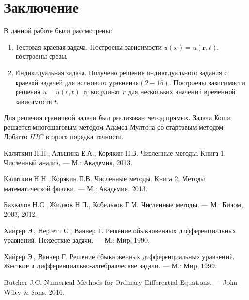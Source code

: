 \documentclass[a4paper,12pt]{article}
\begin{document}
\newpage
\section*{Заключение}
В данной работе были рассмотрены:
 \begin{enumerate}
 	\item Тестовая краевая задача. Построены зависимости $u(x) = u(\textbf{r} , t)$, построены срезы.
 	\item Индивидуальная задача. Получено решение индивидуального задания с краевой задачей для волнового уравнения$(2 - 15)$.
 	Построены зависимости решения \qquad $u = u(r, t)$ от координат $r$ для нескольких значений временной зависимости $t$.
 \end{enumerate}
Для решения граничной задачи был реализован метод прямых. Задача Коши решается многошаговым методом Адамса-Мултона со стартовым методом Лобатто $IIIC$ второго порядка точности.\\


\newpage
{}
\begin{thebibliography}{99}

Калиткин Н.Н., Альшина Е.А., Корякин П.В. 
Численные методы. Книга 1. Численный анализ. --- М.: Академия, 2013. 

Калиткин Н.Н., Корякин П.В. 
Численные методы. Книга 2. Методы математической физики. --- М.: Академия, 2013. 

Бахвалов Н.С., Жидков Н.П., Кобельков Г.М. 
Численные методы. --- М.: Бином, 2003, 2012.

Хайрер Э., Нёрсетт С., Ваннер Г. 
Решение обыкновенных дифференциальных уравнений. 
Нежесткие задачи. --- М.: Мир, 1990.

Хайрер Э., Ваннер Г. 
Решение обыкновенных дифференциальных уравнений. 
Жесткие и дифференциально-алгебраические задачи. --- М.: Мир, 1999.

Butcher J.C. Numerical Methods for Ordinary Differential Equations. --- 
John Wiley \& Sons, 2016.

\end{thebibliography}
\end{document}
